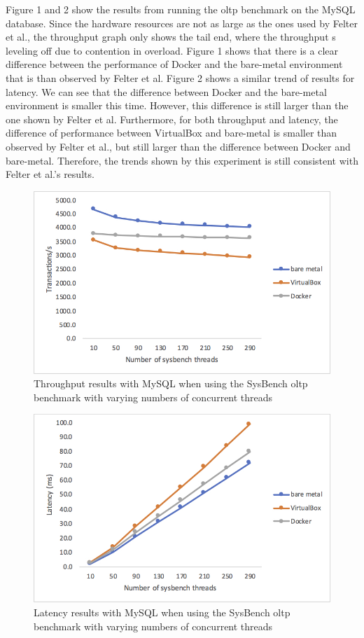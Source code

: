 \documentclass{sig-alternate-10pt}
\begin{document}
Figure 1 and 2 show the results from running the oltp benchmark on the MySQL database. Since the hardware resources are not as large as the ones used by Felter et al., the throughput graph only shows the tail end, where the throughput s leveling off due to contention in overload. Figure 1 shows that there is a clear difference between the performance of Docker and the bare-metal environment that is than observed by Felter et al. Figure 2 shows a similar trend of results for latency. We can see that the difference between Docker and the bare-metal environment is smaller this time. However, this difference is still larger than the one shown by Felter et al. Furthermore, for both throughput and latency, the difference of performance between VirtualBox and bare-metal is smaller than observed by Felter et al., but still larger than the difference between Docker and bare-metal. Therefore, the trends shown by this experiment is still consistent with Felter et al.'s results.

\begin{figure}
\centering
\includegraphics[scale=0.3]{mysql_throughput_graph.jpg}
\caption{Throughput results with MySQL when using the SysBench oltp benchmark with varying numbers of concurrent threads}
\end{figure}

\begin{figure}
\centering
\includegraphics[scale=0.3]{mysql_latency_graph.jpg}
\caption{Latency results with MySQL when using the SysBench oltp benchmark with varying numbers of concurrent threads}
\end{figure}
\end{document}
